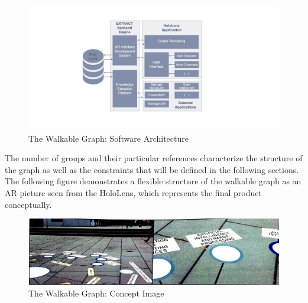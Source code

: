 \documentclass[12pt,a4paper,oneside,american,parskip=half]{article}
\begin{document}
\begin{justify}
\begin{normalsize}
\begin{figure}[h]
\centering
\includegraphics[width=\textwidth]{Arch.jpg}
\caption{The Walkable Graph: Software Architecture \cite{walkable}}
\end{figure}
\newline
The number of groups and their particular references characterize the structure of the graph as well as the constraints that will be defined in the following sections. The following figure demonstrates a flexible structure of the walkable graph as an AR picture seen from the HoloLens, which represents the final product conceptually.
\clearpage

\begin{figure}[h]
\centering
\includegraphics[width=\textwidth]{WalkableGraph.jpg}
\caption{The Walkable Graph: Concept Image \cite{walkable}}
\end{figure} \par


\end{normalsize}
\end{justify}
\end{document}
